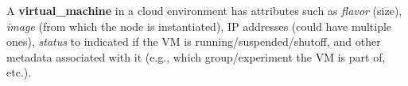 A \textbf{virtual\_machine} in a cloud environment has attributes such as
\textit{flavor} (size), \textit{image} (from which the node is instantiated),
IP addresses (could have multiple ones), \textit{status} to indicated if
the VM is running/suspended/shutoff, and other metadata associated with
it (e.g., which group/experiment the VM is part of, etc.).
